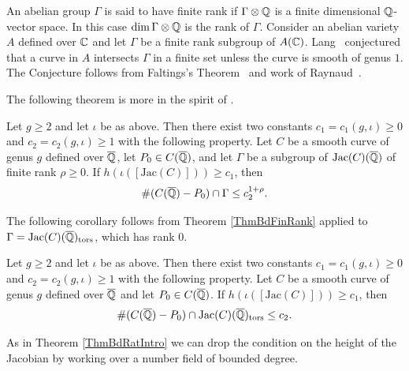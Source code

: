 An abelian group $\Gamma$ is said to have finite rank if
$\Gamma\otimes{\mathbb{Q}}$ is a finite dimensional ${\mathbb{Q}}$-vector space. In this
case $\dim\Gamma\otimes{\mathbb{Q}}$ is the rank of $\Gamma$. 
Consider an abelian variety $A$ defined over ${\mathbb{C}}$ and let $\Gamma$ be
a finite rank subgroup of $A({\mathbb{C}})$. Lang~\cite{Lang:Division}
conjectured that a
curve in $A$ intersects $\Gamma$ in a finite set
unless the curve is smooth of genus $1$. The Conjecture follows from
Faltings's Theorem~\cite{Faltings:ES} and work of
Raynaud~\cite{Raynaud:MMcurves}.

The following theorem is more in the spirit of \cite[top of page
234]{mazur1986arithmetic}.

\begin{theorem}
\label{ThmBdFinRank}
Let $g \ge 2$ and let $\iota$ be as above. Then there exist two
constants $c_1= c_1(g,\iota) \ge 0$ and $c_2 = c_2(g,\iota) \ge 1$ with the following property. Let $C$
be a  smooth curve of genus $g$  defined over ${\overline{\mathbb{Q}}}$,
let $P_0 \in C(\overline {{\mathbb{Q}}})$, and let $\Gamma$ be a
subgroup of $\mathrm{Jac}(C)(\overline {{\mathbb{Q}}})$ of finite rank $\rho\ge
0$. If $h(\iota([\mathrm{Jac}(C)])) \ge c_1$, then
\[
\#(C(\overline {{\mathbb{Q}}})-P_0) \cap \Gamma  \le c_2^{1+\rho}.
\]
\end{theorem}

The following corollary follows from Theorem \ref{ThmBdFinRank} applied to 
$\Gamma = \mathrm{Jac}(C)({\overline{\mathbb{Q}}})_{\mathrm{tors}}$, which has rank $0$. 


\begin{corollary}
Let $g \ge 2$ and let $\iota$ be as above.
Then there exist two
constants $c_1= c_1(g,\iota) \ge 0$ and $c_2 = c_2(g,\iota) \ge 1$ with the following property. Let $C$
be a  smooth curve of genus $g$  defined over $\overline {{\mathbb{Q}}}$ and  let $P_0 \in C(\overline {{\mathbb{Q}}})$.
If $h(\iota([\mathrm{Jac}(C)])) \ge c_1$, then
\[
\# (C(\overline {{\mathbb{Q}}})-P_0) \cap \mathrm{Jac}(C)({\overline{\mathbb{Q}}})_{\mathrm{tors}}  \le c_2.
\]
\end{corollary}

As in Theorem \ref{ThmBdRatIntro} we can drop the condition on the
height of the Jacobian by working over a number field of bounded
degree. 

